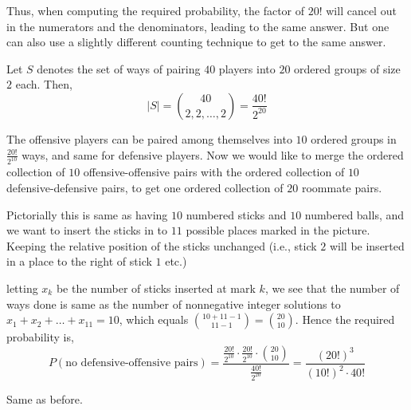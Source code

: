 Thus, when computing the required probability, the factor of $20!$ will cancel
out in the numerators and the denominators, leading to the same answer. But one
can also use a slightly different counting technique to get to the same answer.
\begin{solution}
    Let $S$ denotes the set of ways of pairing $40$ players into $20$ ordered
groups of size $2$ each. Then,
\begin{equation*}
    \vert S \vert = {{40} \choose {2, 2, \dots, 2}} = \frac{40!}{2^{20}}
\end{equation*}

    The offensive players can be paired among themselves into $10$ ordered
groups in $\frac{20!}{2^{10}}$ ways, and same for defensive players. Now we
would like to merge the ordered collection of $10$ offensive-offensive pairs
with the ordered collection of $10$ defensive-defensive pairs, to get one
ordered collection of $20$ roommate pairs. 

    Pictorially this is same as having $10$ numbered sticks and $10$ numbered
balls, and we want to insert the sticks in to $11$ possible places marked in
the picture. Keeping the relative position of the sticks unchanged (i.e., stick
$2$ will be inserted in a place to the right of stick $1$ etc.)
\begin{figure}[H]
    \centering
    
\end{figure}
letting $x_k$ be the number of sticks inserted at mark $k$, we see that the
number of ways done is same as the number of nonnegative integer solutions to
$x_1 + x_2 + \dots + x_{11} = 10$, which equals ${{10 + 11 - 1} \choose {11 -
1}} = {20 \choose 10}$. Hence the required probability is,
\begin{equation*}
    P(\text{no defensive-offensive pairs}) 
    = \frac{\frac{20!}{2^{10}} \cdot
            \frac{20!}{2^{10}} \cdot
            {20 \choose 10}}
           {\frac{40!}{2^{20}}}
    = \frac{(20!)^3}{(10!)^2 \cdot 40!}
\end{equation*}

    Same as before.
\end{solution}

